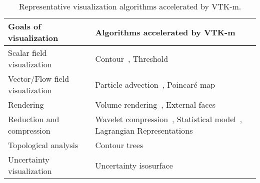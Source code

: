 \begin{table*}[htbp]
\caption{
Representative visualization algorithms accelerated by VTK-m.
}
\label{tab:summarytable}
\begin{tabularx}{\textwidth}{l|X}
\toprule
    Goals of visualization & Algorithms accelerated by VTK-m\\ \hline
    Scalar field visualization & Contour~\cite{Lo2012}, Threshold~\cite{Maynard2013}  \\ \hline
    Vector/Flow field visualization & Particle advection~\cite{Pugmire2018}, Poincar\'{e} map~\cite{suchyta2022hybrid}  \\ \hline
    Rendering & Volume rendering~\cite{Larsen2015:VR,Larsen2015:RayTrace}, External faces \cite{Lessley2016}  \\ \hline
    Reduction and compression &
    Wavelet compression~\cite{li2017achieving}, Statistical model~\cite{wang2019statistical},  Lagrangian Representations~\cite{sane2021investigating}  
    \\ \hline
    Topological analysis & Contour trees~\cite{carr2021optimization}  \\ \hline
    Uncertainty visualization & Uncertainty isosurface~\cite{wang2023funmc}  \\
\bottomrule
\end{tabularx}
\end{table*}

